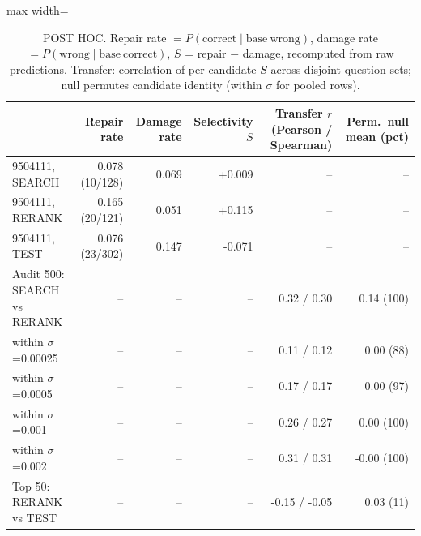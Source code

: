 \begin{table}[t]
\centering
\small
\begin{adjustbox}{max width=\linewidth}
\begin{tabular}{lrrrrr}
\toprule
 & Repair rate & Damage rate & Selectivity $S$ & Transfer $r$ (Pearson / Spearman) & Perm.\ null mean (pct) \\
\midrule
9504111, SEARCH & 0.078 (10/128) & 0.069 & +0.009 & -- & -- \\
9504111, RERANK & 0.165 (20/121) & 0.051 & +0.115 & -- & -- \\
9504111, TEST & 0.076 (23/302) & 0.147 & -0.071 & -- & -- \\
\midrule
Audit 500: SEARCH vs RERANK & -- & -- & -- & 0.32 / 0.30 & 0.14 (100) \\
\quad within $\sigma$=0.00025 & -- & -- & -- & 0.11 / 0.12 & 0.00 (88) \\
\quad within $\sigma$=0.0005 & -- & -- & -- & 0.17 / 0.17 & 0.00 (97) \\
\quad within $\sigma$=0.001 & -- & -- & -- & 0.26 / 0.27 & 0.00 (100) \\
\quad within $\sigma$=0.002 & -- & -- & -- & 0.31 / 0.31 & -0.00 (100) \\
Top 50: RERANK vs TEST & -- & -- & -- & -0.15 / -0.05 & 0.03 (11) \\
\bottomrule
\end{tabular}
\end{adjustbox}
\caption{POST HOC. Repair rate $=P(\mathrm{correct}\mid\mathrm{base\ wrong})$, damage rate $=P(\mathrm{wrong}\mid\mathrm{base\ correct})$, $S$ = repair $-$ damage, recomputed from raw predictions. Transfer: correlation of per-candidate $S$ across disjoint question sets; null permutes candidate identity (within $\sigma$ for pooled rows).}
\label{tab:repair-selectivity}
\end{table}
